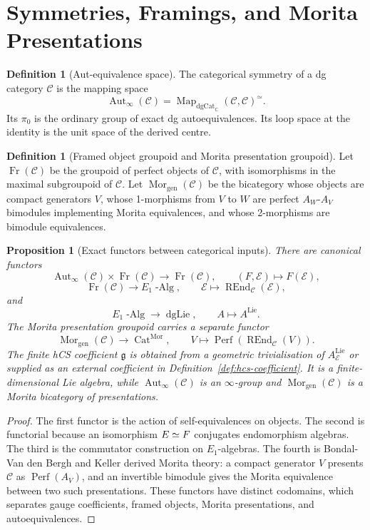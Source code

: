\documentclass[11pt]{amsart}
\theoremstyle{plain}
\newtheorem{proposition}[theorem]{Proposition}
\theoremstyle{definition}
\newtheorem{definition}[theorem]{Definition}
\theoremstyle{remark}
\providecommand{\C}{\mathbb{C}}
\providecommand{\cC}{\mathcal{C}}
\providecommand{\cE}{\mathcal{E}}
\providecommand{\fg}{\mathfrak{g}}
\providecommand{\Perf}{\operatorname{Perf}}
\providecommand{\REnd}{\operatorname{REnd}}
\providecommand{\Aut}{\operatorname{Aut}}
\providecommand{\Map}{\operatorname{Map}}
\providecommand{\Mor}{\operatorname{Mor}}
\providecommand{\Fr}{\operatorname{Fr}}
\providecommand{\Eone}{E_1}
\begin{document}
\section{Symmetries, Framings, and Morita Presentations}
\label{sec:symmetries-framings-morita}

\begin{definition}[Aut-equivalence space]
\label{def:aut-infty}
The categorical symmetry of a dg category \(\cC\) is the mapping space
\[
  \Aut_\infty(\cC)
  =
  \Map_{\mathrm{dgCat}_\C}(\cC,\cC)^\simeq .
\]
Its \(\pi_0\) is the ordinary group of exact dg autoequivalences. Its
loop space at the identity is the unit space of the derived centre.
\end{definition}

\begin{definition}[Framed object groupoid and Morita presentation groupoid]
\label{def:two-framing-groupoids}
Let \(\Fr(\cC)\) be the groupoid of perfect objects of \(\cC\), with
isomorphisms in the maximal subgroupoid of \(\cC\). Let
\(\Mor_{\mathrm{gen}}(\cC)\) be the bicategory whose objects are compact
generators \(V\), whose 1-morphisms from \(V\) to \(W\) are perfect
\(A_W\)-\(A_V\) bimodules implementing Morita equivalences, and whose
2-morphisms are bimodule equivalences.
\end{definition}

\begin{proposition}[Exact functors between categorical inputs]
\label{prop:exact-functors}
There are canonical functors
\[
  \Aut_\infty(\cC)\times\Fr(\cC)
  \longrightarrow
  \Fr(\cC),
  \qquad
  (F,\cE)\longmapsto F(\cE),
\]
\[
  \Fr(\cC)
  \longrightarrow
  \Eone\operatorname{-Alg},
  \qquad
  \cE\longmapsto\REnd_{\cC}(\cE),
\]
and
\[
  \Eone\operatorname{-Alg}
  \longrightarrow
  \operatorname{dgLie},
  \qquad
  A\longmapsto A^{\operatorname{Lie}} .
\]
The Morita presentation groupoid carries a separate functor
\[
  \Mor_{\mathrm{gen}}(\cC)
  \longrightarrow
  \operatorname{Cat}^{\mathrm{Mor}},
  \qquad
  V\longmapsto \Perf(\REnd_{\cC}(V)).
\]
The finite hCS coefficient \(\fg\) is obtained from a geometric
trivialisation of \(A_{\cE}^{\operatorname{Lie}}\) or supplied as an
external coefficient in Definition~\ref{def:hcs-coefficient}. It is a
finite-dimensional Lie algebra, while \(\Aut_\infty(\cC)\) is an
\(\infty\)-group and \(\Mor_{\mathrm{gen}}(\cC)\) is a Morita
bicategory of presentations.
\end{proposition}

\begin{proof}
The first functor is the action of self-equivalences on objects. The
second is functorial because an isomorphism \(\cE\simeq\cF\) conjugates
endomorphism algebras. The third is the commutator construction on
\(\Eone\)-algebras. The fourth is Bondal-Van den Bergh and Keller
derived Morita theory: a compact generator \(V\) presents \(\cC\) as
\(\Perf(A_V)\), and an invertible bimodule gives the Morita equivalence
between two such presentations. These functors have distinct codomains,
which separates gauge coefficients, framed objects, Morita
presentations, and autoequivalences.
\end{proof}
\end{document}

